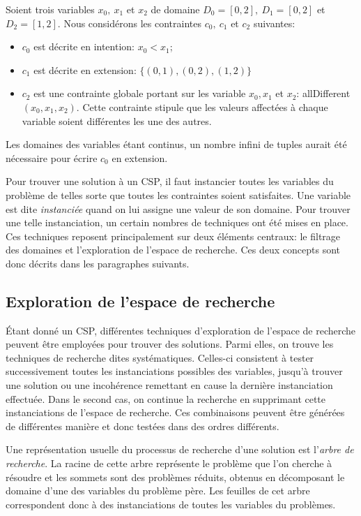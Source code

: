 \begin{itemize}
\begin{ex}
  Soient trois variables $x_0,\ x_1$ et $x_2$ de domaine $D_0=[0,2],\
  D_1=[0,2]$ et $D_2=[1,2]$. 
  Nous considérons les contraintes $c_0,\ c_1$ et $c_2$ suivantes:
  \begin{itemize}
  \item $c_0$ est décrite en intention: $x_0 < x_1$;
  \item $c_1$ est décrite en extension: $\{(0,1) , (0,2), (1,2)\}$
  \item $c_2$ est une contrainte  globale portant sur les variable
    $x_0,x_1$ et $x_2$: allDifferent$(x_0,x_1,x_2)$. Cette contrainte
    stipule que les valeurs affectées à chaque variable soient
    différentes les une des autres. 
  \end{itemize}
  Les domaines des variables étant continus, un nombre infini de
tuples aurait été nécessaire pour écrire $c_0$ en extension.
\end{ex}

Pour trouver une solution à un CSP, il faut instancier toutes les
variables du problème de telles sorte que toutes les contraintes
soient satisfaites. Une variable est dite {\it instanciée} quand on
lui assigne une valeur de son domaine. Pour trouver une telle
instanciation, un certain nombres de techniques ont été mises en
place. Ces techniques reposent principalement sur deux éléments
centraux: le filtrage des domaines et l'exploration de l'espace de
recherche. Ces deux concepts sont donc décrits dans les paragraphes
suivants.

\subsection{Exploration de l'espace de recherche}
\label{sec:PPC_rech}

{\'E}tant donné un CSP, différentes techniques d'exploration de
l'espace de recherche peuvent être employées pour trouver des
solutions. Parmi elles, on trouve les techniques de recherche dites
systématiques. Celles-ci consistent à tester successivement toutes les
instanciations possibles des variables, jusqu'à trouver une solution
ou une incohérence remettant en cause la dernière instanciation
effectuée. Dans le second cas, on continue la recherche en supprimant
cette instanciations de l'espace de recherche. Ces combinaisons
peuvent être générées de différentes manière et donc testées dans des
ordres différents. 

Une représentation usuelle du processus de recherche d'une solution
est l'{\it arbre de recherche}. La racine de cette arbre représente le
problème que l'on cherche à résoudre et les sommets sont des problèmes
réduits, obtenus en décomposant le domaine d'une des variables du
problème père. Les feuilles de cet arbre correspondent donc à des
instanciations de toutes les variables du problèmes.


\end{itemize}
